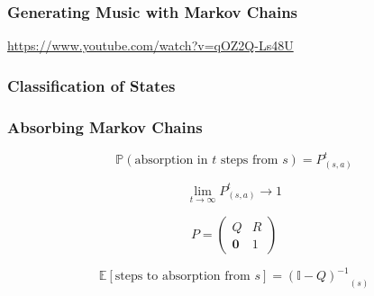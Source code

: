\documentclass{beamer}
\begin{document}
\begin{frame}
\frametitle{Generating Music with Markov Chains}
\url{https://www.youtube.com/watch?v=qOZ2Q-Ls48U}
\end{frame}



\begin{frame}
\frametitle{Classification of States}
\begin{figure}
  
\end{figure}
\end{frame}


\begin{frame}
\frametitle{Absorbing Markov Chains}

\begin{tcolorbox}[colback=orange!25!yellow!25,colframe=orange!50!yellow,title=\textit{Probability of Absorption},coltitle=black]

\begin{equation*}
\mathbb{P}\left(\text{absorption in $t$ steps from } s\right) = P^{t}_{(s,a)}
\end{equation*}

\begin{equation*}
\lim_{t\to\infty}P^{t}_{(s,a)} \rightarrow 1
\end{equation*}
\end{tcolorbox}
\pause

\begin{tcolorbox}[colback=orange!25!yellow!25,colframe=orange!50!yellow,title=\textit{Mean Steps to Absorption},coltitle=black]

\begin{equation*}
P = \left(\begin{array}{cc}Q & R\\
\textbf{0} & 1\end{array}\right)
\end{equation*}

\begin{equation*}
\mathbb{E}\left[\text{steps to absorption from } s\right] = {\left(\mathbb{I} - Q\right)^{-1}}_{(s)}
\end{equation*}
\end{tcolorbox}

\end{frame}
\end{document}
